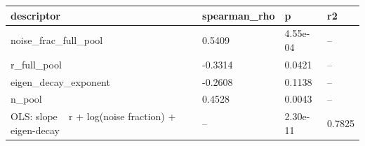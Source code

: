 \begin{tabular}{llll}
\hline
descriptor & spearman\_rho & p & r2 \\
\hline
noise\_frac\_full\_pool & 0.5409 & 4.55e-04 & – \\
r\_full\_pool & -0.3314 & 0.0421 & – \\
eigen\_decay\_exponent & -0.2608 & 0.1138 & – \\
n\_pool & 0.4528 & 0.0043 & – \\
OLS: slope ~ r + log(noise fraction) + eigen-decay & – & 2.30e-11 & 0.7825 \\
\hline
\end{tabular}
